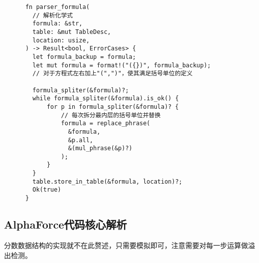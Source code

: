 \documentclass[1pt]{article}
\begin{document}
      \begin{lstlisting}
      fn parser_formula(
        // 解析化学式
        formula: &str,
        table: &mut TableDesc,
        location: usize,
      ) -> Result<bool, ErrorCases> {
        let formula_backup = formula;
        let mut formula = format!("({})", formula_backup);
        // 对于方程式左右加上"(",")"，使其满足括号单位的定义

        formula_spliter(&formula)?;
        while formula_spliter(&formula).is_ok() {
            for p in formula_spliter(&formula)? {
                // 每次拆分最内层的括号单位并替换
                formula = replace_phrase(
                  &formula,
                  &p.all,
                  &(mul_phrase(&p)?)
                );
            }
        }
        table.store_in_table(&formula, location)?;
        Ok(true)
      }
      \end{lstlisting}
    \subsection{AlphaForce代码核心解析}
      分数数据结构的实现就不在此赘述，只需要模拟即可，注意需要对每一步运算做溢出检测。
\end{document}
